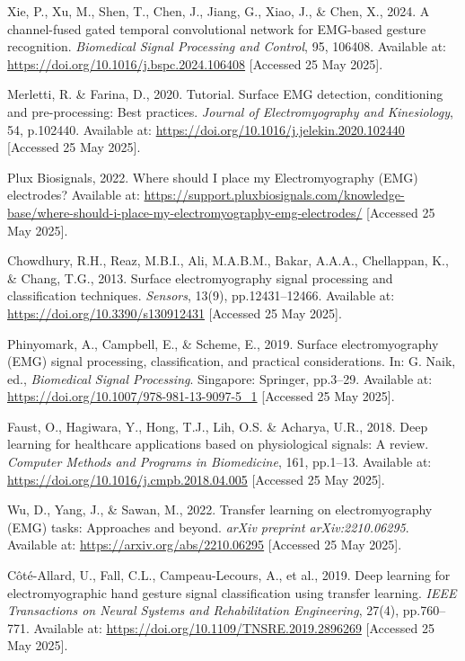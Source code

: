 \begin{multicols}{2}
\begin{thebibliography}{99}
Xie, P., Xu, M., Shen, T., Chen, J., Jiang, G., Xiao, J., \& Chen, X., 2024. A channel-fused gated temporal convolutional network for EMG-based gesture recognition. \textit{Biomedical Signal Processing and Control}, 95, 106408. Available at: \url{https://doi.org/10.1016/j.bspc.2024.106408} [Accessed 25 May 2025].

Merletti, R. \& Farina, D., 2020. Tutorial. Surface EMG detection, conditioning and pre-processing: Best practices. \textit{Journal of Electromyography and Kinesiology}, 54, p.102440. Available at: \url{https://doi.org/10.1016/j.jelekin.2020.102440} [Accessed 25 May 2025].

Plux Biosignals, 2022. Where should I place my Electromyography (EMG) electrodes? Available at: \url{https://support.pluxbiosignals.com/knowledge-base/where-should-i-place-my-electromyography-emg-electrodes/} [Accessed 25 May 2025].

Chowdhury, R.H., Reaz, M.B.I., Ali, M.A.B.M., Bakar, A.A.A., Chellappan, K., \& Chang, T.G., 2013. Surface electromyography signal processing and classification techniques. \textit{Sensors}, 13(9), pp.12431–12466. Available at: \url{https://doi.org/10.3390/s130912431} [Accessed 25 May 2025].

Phinyomark, A., Campbell, E., \& Scheme, E., 2019. Surface electromyography (EMG) signal processing, classification, and practical considerations. In: G. Naik, ed., \textit{Biomedical Signal Processing}. Singapore: Springer, pp.3–29. Available at: \url{https://doi.org/10.1007/978-981-13-9097-5_1} [Accessed 25 May 2025].

Faust, O., Hagiwara, Y., Hong, T.J., Lih, O.S. \& Acharya, U.R., 2018. Deep learning for healthcare applications based on physiological signals: A review. \textit{Computer Methods and Programs in Biomedicine}, 161, pp.1–13. Available at: \url{https://doi.org/10.1016/j.cmpb.2018.04.005} [Accessed 25 May 2025].

Wu, D., Yang, J., \& Sawan, M., 2022. Transfer learning on electromyography (EMG) tasks: Approaches and beyond. \textit{arXiv preprint arXiv:2210.06295}. Available at: \url{https://arxiv.org/abs/2210.06295} [Accessed 25 May 2025].

Côté-Allard, U., Fall, C.L., Campeau-Lecours, A., et al., 2019. Deep learning for electromyographic hand gesture signal classification using transfer learning. \textit{IEEE Transactions on Neural Systems and Rehabilitation Engineering}, 27(4), pp.760–771. Available at: \url{https://doi.org/10.1109/TNSRE.2019.2896269} [Accessed 25 May 2025].


\end{thebibliography}
\end{multicols}
